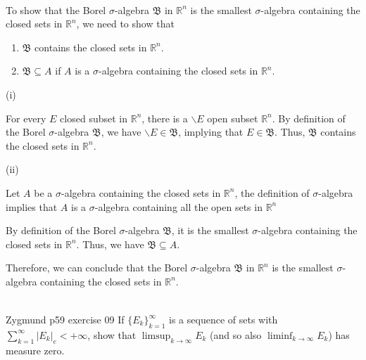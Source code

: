 \documentclass[UTF8,a4paper,10pt]{article}
\begin{document}
  \begin{solution}\,\\

    To show that the Borel \(\sigma\)-algebra \(\mathfrak{B}\)  in \(\mathbb{R}^n\)  is the smallest \(\sigma\)-algebra containing the closed sets in \(\mathbb{R}^n\), we need to show that 

    \begin{enumerate}[label=(\roman*)]
      \item \(\mathfrak{B}\) contains the closed sets in \(\mathbb{R}^n\).
      \item \(\mathfrak{B} \subseteq A\) if \(A\) is a \(\sigma\)-algebra containing the closed sets in \(\mathbb{R}^n\).
    \end{enumerate}

(i)

For every \(E\) closed subset in \(\mathbb{R}^n\), there is a \(\backslash E\) open subset \(\mathbb{R}^n\). By definition of the Borel \(\sigma\)-algebra \(\mathfrak{B}\), we have \(\backslash E \in \mathfrak{B}\), implying that \(E\in \mathfrak{B}\). Thus, \(\mathfrak{B}\) contains the closed sets in \(\mathbb{R}^n\).

(ii)

Let \(A\) be a \(\sigma\)-algebra containing the closed sets in \(\mathbb{R}^n\), the definition of \(\sigma\)-algebra implies that \(A\) is a \(\sigma\)-algebra containing all the open sets in \(\mathbb{R}^n\)

By definition of the Borel \(\sigma\)-algebra \(\mathfrak{B}\), it is the smallest \(\sigma\)-algebra containing the closed sets in \(\mathbb{R}^n\). Thus, we have \(\mathfrak{B} \subseteq A\).

Therefore, we can conclude that the Borel \(\sigma\)-algebra \(\mathfrak{B}\)  in \(\mathbb{R}^n\)  is the smallest \(\sigma\)-algebra containing the closed sets in \(\mathbb{R}^n\).



\begin{equation*}
  \begin{aligned}
  \end{aligned}
\end{equation*}


  \end{solution}

  
  \begin{Problem}[]{Zygmund p59 exercise 09}
    If \(\{E_k\}_{k=1}^{\infty}\) is a sequence of sets with \(\sum_{k=1}^{\infty}|E_k|_e<+\infty\), show that \(\limsup_{k\to\infty}E_k\)
    (and so also \(\liminf_{k\to\infty}E_k\)) has measure zero.
  \end{Problem}
\end{document}
